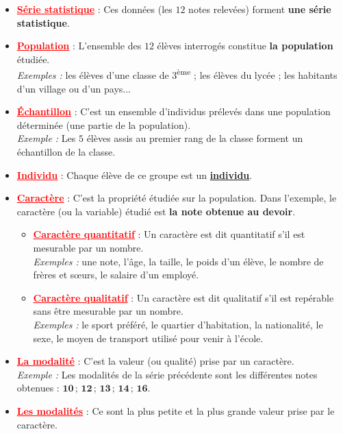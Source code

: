 \documentclass[12pt,a4paper]{article}
\begin{document}
\begin{itemize}
    \item \textcolor{red}{\textbf{\underline{Série statistique}}} : Ces données (les $12$ notes relevées) forment \textbf{une série statistique}.
    \item \textcolor{red}{\textbf{\underline{Population}}} : L'ensemble des $12$ élèves interrogés constitue \textbf{la population} étudiée. \\
    \textit{Exemples :} les élèves d'une classe de 3\textsuperscript{ème} ; les élèves du lycée ; les habitants d'un village ou d'un pays...
    \item \textcolor{red}{\textbf{\underline{Échantillon}}} : C'est un ensemble d'individus prélevés dans une population déterminée (une partie de la population). \\
    \textit{Exemple :} Les $5$ élèves assis au premier rang de la classe forment un échantillon de la classe.
    \item \textcolor{red}{\textbf{\underline{Individu}}} : Chaque élève de ce groupe est un \textbf{\underline{individu}}.
    \item \textcolor{red}{\textbf{\underline{Caractère}}} : C'est la propriété étudiée sur la population. Dans l'exemple, le caractère (ou la variable) étudié est \textbf{la note obtenue au devoir}.
    \begin{itemize}
        \item \textcolor{red}{\textbf{\underline{Caractère quantitatif}}} : Un caractère est dit quantitatif s'il est mesurable par un nombre. \\
        \textit{Exemples :} une note, l'âge, la taille, le poids d'un élève, le nombre de frères et sœurs, le salaire d'un employé.
        \item \textcolor{red}{\textbf{\underline{Caractère qualitatif}}} : Un caractère est dit qualitatif s'il est repérable sans être mesurable par un nombre. \\
        \textit{Exemples :} le sport préféré, le quartier d'habitation, la nationalité, le sexe, le moyen de transport utilisé pour venir à l'école.
    \end{itemize}
    \item \textcolor{red}{\textbf{\underline{La modalité}}} : C'est la valeur (ou qualité) prise par un caractère. \\
    \textit{Exemple :} Les modalités de la série précédente sont les différentes notes obtenues : $\mathbf{10 \,;\, 12 \,;\, 13 \,;\, 14 \,;\, 16}$.
    \item \textcolor{red}{\textbf{\underline{Les modalités}}} : Ce sont la plus petite et la plus grande valeur prise par le caractère. \\

\end{itemize}
\end{document}
